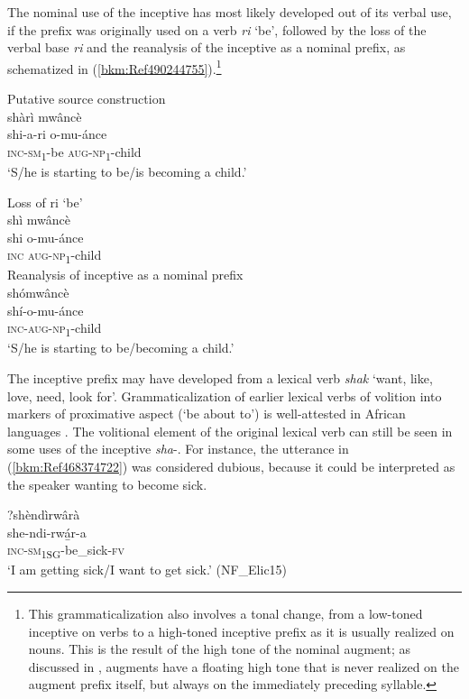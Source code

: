 The nominal use of the inceptive has most likely developed out of its verbal use, if the prefix was originally used on a verb \textit{ri} ‘be’, followed by the loss of the verbal base \textit{ri} and the reanalysis of the inceptive as a nominal prefix, as schematized in (\ref{bkm:Ref490244755}).\footnote{This grammaticalization also involves a tonal change, from a low-toned inceptive on verbs to a high-toned inceptive prefix as it is usually realized on nouns. This is the result of the high tone of the nominal augment; as discussed in , augments have a floating high tone that is never realized on the augment prefix itself, but always on the immediately preceding syllable.}

\ea
\label{bkm:Ref490244755}
\ea
Putative source construction\\
shàrì mwâncè\\
\gll shi-a-ri  o-mu-ánce\\
\textsc{inc}-\textsc{sm}\textsubscript{1}-be  \textsc{aug}-\textsc{np}\textsubscript{1}-child\\
\glt ‘S/he is starting to be/is becoming a child.’

\ex
Loss of ri ‘be’ \\
shì mwâncè\\
\gll shi  o-mu-ánce\\
\textsc{inc}  \textsc{aug}-\textsc{np}\textsubscript{1}-child\\

\ex
Reanalysis of inceptive as a nominal prefix\\
\glll shómwâncè\\
shí-o-mu-ánce\\
\textsc{inc}-\textsc{aug}-\textsc{np}\textsubscript{1}-child\\
\glt ‘S/he is starting to be/becoming a child.’
\z
\z

The inceptive prefix may have developed from a lexical verb \textit{shak} ‘want, like, love, need, look for’. Grammaticalization of earlier lexical verbs of volition into markers of proximative aspect (‘be about to’) is well-attested in African languages \citep{Heine1994}. The volitional element of the original lexical verb can still be seen in some uses of the inceptive \textit{sha}-. For instance, the utterance in (\ref{bkm:Ref468374722}) was considered dubious, because it could be interpreted as the speaker wanting to become sick.

\ea
\label{bkm:Ref468374722}
?shèndìrwârà\\
\gll she-ndi-rwá̲r-a\\
\textsc{inc}-\textsc{sm}\textsubscript{1SG}-be\_sick-\textsc{fv}\\
\glt ‘I am getting sick/I want to get sick.’ (NF\_Elic15)
\z

